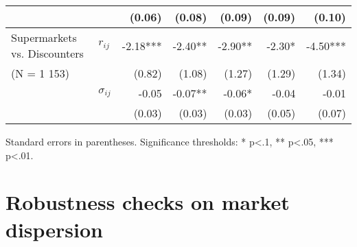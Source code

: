 \documentclass[english]{article}
\begin{document}
\begin{table}
\begin{threeparttable}
\begin{tabular}{rrrrrrr}
          &       & (0.06) & (0.08) & (0.09) & (0.09) & (0.10) \\
    \midrule
    \multicolumn{1}{l}{Supermarkets vs. Discounters} & \multicolumn{1}{l}{$r_{ij}$} & -2.18*** & -2.40** & -2.90** & -2.30* & -4.50*** \\
    \multicolumn{1}{l}{(N = 1 153)} &       & (0.82) & (1.08) & (1.27) & (1.29) & (1.34) \\
          & \multicolumn{1}{l}{$\sigma_{ij}$} & -0.05 & -0.07** & -0.06* & -0.04 & -0.01 \\
          &       & (0.03) & (0.03) & (0.03) & (0.05) & (0.07) \\
    \bottomrule
    \bottomrule
\end{tabular}
\begin{tablenotes}
      \small
      \item Standard errors in parentheses. Significance thresholds: * p<.1, ** p<.05, *** p<.01.
\end{tablenotes}
\end{threeparttable}
\end{table}

\newpage

\section{Robustness checks on market dispersion}
\end{document}

